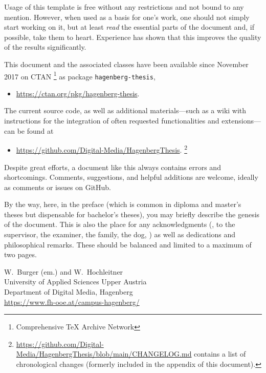Usage of this template is free without any restrictions and not bound to any
mention. However, when used as a basis for one's work, one should not simply
start working on it, but at least \emph{read} the essential parts of the
document and, if possible, take them to heart. Experience has shown that this
improves the quality of the results significantly.

This document and the associated \latex classes have been available since
November 2017 on CTAN%
\footnote{Comprehensive TeX Archive Network} 
as package \texttt{hagenberg-thesis},
%
\begin{itemize}
	\item[]\url{https://ctan.org/pkg/hagenberg-thesis}.
\end{itemize}
%
The current source code, as well as additional materials---such as a wiki with
instructions for the integration of often requested functionalities and
extensions---can be found at
%
\begin{itemize}
  \item[]\url{https://github.com/Digital-Media/HagenbergThesis}.%
  \footnote{\url{https://github.com/Digital-Media/HagenbergThesis/blob/main/CHANGELOG.md}
  contains a list of chronological changes (formerly included in the appendix
  of this document).}
\end{itemize}

\noindent
Despite great efforts, a document like this always contains errors and
shortcomings. Comments, suggestions, and helpful additions are welcome, ideally
as comments or issues on GitHub.

By the way, here, in the preface (which is common in diploma and master's theses
but dispensable for bachelor's theses), you may briefly describe the genesis of
the document. This is also the place for any acknowledgments (\eg, to the
supervisor, the examiner, the family, the dog, \etc) as well as dedications and
philosophical remarks. These should be balanced and limited to a maximum of two
pages.

\vspace{6ex}
\noindent
W.\ Burger (em.) and W.\ Hochleitner\\[1ex]
University of Applied Sciences Upper Austria\\ 
Department of Digital Media, Hagenberg\\
\url{https://www.fh-ooe.at/campus-hagenberg/}
